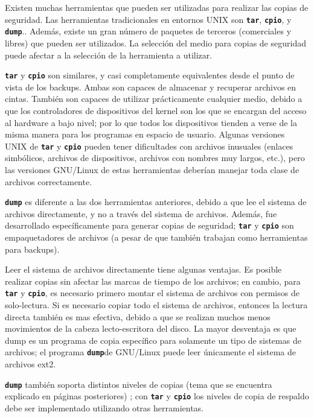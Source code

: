 Existen muchas herramientas que pueden ser utilizadas para realizar las copias 
de seguridad. Las herramientas tradicionales en entornos UNIX 
son \texttt{\textbf{tar}}, \texttt{\textbf{cpio}}, y
	\texttt{\textbf{dump}}.. Además, existe un gran número de paquetes de terceros 
(comerciales y libres) que pueden ser utilizados. La selección del medio para 
copias de seguridad puede afectar a la selección de la herramienta a utilizar.

	 \texttt{\textbf{tar}} y \texttt{\textbf{cpio}}
son similares, y casi completamente equivalentes desde el punto de 
vista de los backups. Ambas son capaces de almacenar y recuperar 
archivos en cintas. También son capaces de utilizar 
prácticamente cualquier medio, debido a que los controladores de dispositivos del kernel son 
los que se encargan del acceso al hardware a bajo nivel; por lo que todos los dispositivos
tienden a verse de la misma manera para los programas en espacio de usuario.
Algunas versiones UNIX de \texttt{\textbf{tar}}
	y \texttt{\textbf{cpio}}
pueden tener dificultades con archivos inusuales 
(enlaces simbólicos, archivos de dispositivos, archivos con nombres
muy largos, etc.), pero las versiones GNU/Linux de estas herramientas deberían 
manejar toda clase de archivos correctamente.

	 \texttt{\textbf{dump}}
es diferente a las dos herramientas anteriores, debido a que lee el 
sistema de archivos directamente, y no a través del sistema de archivos. 
Además, fue desarrollado específicamente para generar copias de seguridad;
 \texttt{\textbf{tar}}
	y \texttt{\textbf{cpio}} son empaquetadores de archivos (a pesar de que también trabajan como 
herramientas para backups).

	

Leer el sistema de archivos directamente tiene algunas ventajas. Es posible 
realizar copias sin afectar las marcas de tiempo de los archivos; 
en cambio, para \texttt{\textbf{tar}} y \texttt{\textbf{cpio}}, es necesario primero montar el 
sistema de archivos con permisos de solo-lectura. Si es necesario copiar 
todo el sistema de archivos, entonces la lectura directa también es mas efectiva,
debido a que se realizan 
muchos menos movimientos de la cabeza lecto-escritora del disco. La mayor desventaja
es que dump es un programa de copia específico para solamente un tipo de sistemas
de archivos;
el programa \texttt{\textbf{dump}}de GNU/Linux puede leer únicamente el sistema
de archivos ext2.

	 \texttt{\textbf{dump}}
también soporta distintos niveles de copias (tema que se encuentra
explicado en páginas posteriores)
; con \texttt{\textbf{tar}} y \texttt{\textbf{cpio}} los niveles de copia de respaldo debe 
ser implementado utilizando otras herramientas.

